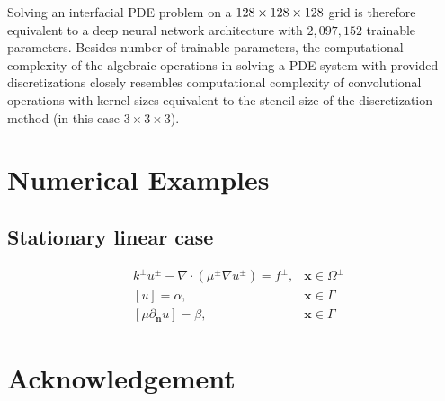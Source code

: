 \documentclass{elsarticle}
\begin{document}
Solving an interfacial PDE problem on a $\rm 128\times 128 \times 128$ grid is therefore equivalent to a deep neural network architecture with $2,097,152$ trainable parameters. Besides number of trainable parameters, the computational complexity of the algebraic operations in solving a PDE system with provided discretizations closely resembles computational complexity of convolutional operations with kernel sizes equivalent to the stencil size of the discretization method (in this case $3\times 3 \times 3$).
 
\section{Numerical Examples}
\subsection{Stationary linear case}
\begin{align*}
&k^{\pm}u^{\pm} - \nabla \cdot (\mu^{\pm}\nabla u^\pm)=f^{\pm}, & \mathbf{x}\in\Omega^\pm\\
&[u]=\alpha, & \mathbf{x} \in \Gamma\\
&[\mu \partial_{\mathbf{n}}u]=\beta, & \mathbf{x} \in \Gamma
\end{align*}




\section*{Acknowledgement}



\newpage


\end{document}
